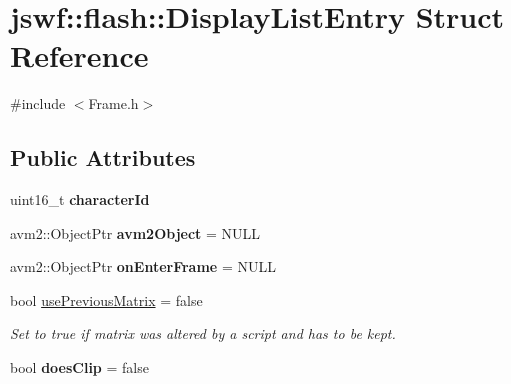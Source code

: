\hypertarget{structjswf_1_1flash_1_1_display_list_entry}{\section{jswf\+:\+:flash\+:\+:Display\+List\+Entry Struct Reference}
\label{structjswf_1_1flash_1_1_display_list_entry}
}


{\ttfamily \#include $<$Frame.\+h$>$}

\subsection*{Public Attributes}
\begin{DoxyCompactItemize}
\item 
\hypertarget{structjswf_1_1flash_1_1_display_list_entry_a8bae9b8a903b5dba94f5b6f82444ddb3}{uint16\+\_\+t {\bfseries character\+Id}}\label{structjswf_1_1flash_1_1_display_list_entry_a8bae9b8a903b5dba94f5b6f82444ddb3}

\item 
\hypertarget{structjswf_1_1flash_1_1_display_list_entry_a0ccf4f431308416dd030b69197865bfc}{avm2\+::\+Object\+Ptr {\bfseries avm2\+Object} = N\+U\+L\+L}\label{structjswf_1_1flash_1_1_display_list_entry_a0ccf4f431308416dd030b69197865bfc}

\item 
\hypertarget{structjswf_1_1flash_1_1_display_list_entry_a5b1eba4da61f771da0f058ec580ed5e6}{avm2\+::\+Object\+Ptr {\bfseries on\+Enter\+Frame} = N\+U\+L\+L}\label{structjswf_1_1flash_1_1_display_list_entry_a5b1eba4da61f771da0f058ec580ed5e6}

\item 
\hypertarget{structjswf_1_1flash_1_1_display_list_entry_af91ac80206f164a044f705737815f869}{bool \hyperlink{structjswf_1_1flash_1_1_display_list_entry_af91ac80206f164a044f705737815f869}{use\+Previous\+Matrix} = false}\label{structjswf_1_1flash_1_1_display_list_entry_af91ac80206f164a044f705737815f869}

\begin{DoxyCompactList}\small\item\em Set to {\ttfamily true} if matrix was altered by a script and has to be kept. \end{DoxyCompactList}\item 
\hypertarget{structjswf_1_1flash_1_1_display_list_entry_a32fdfad6013761553087b7cd94a2e208}{bool {\bfseries does\+Clip} = false}\label{structjswf_1_1flash_1_1_display_list_entry_a32fdfad6013761553087b7cd94a2e208}


\end{DoxyCompactItemize}
